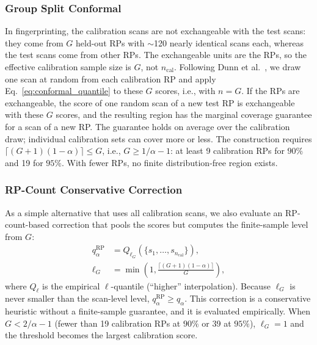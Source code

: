 \subsubsection{Group Split Conformal}
\label{subsubsec:group_conformal}
In fingerprinting, the calibration scans are not exchangeable with the test scans: they come from $G$ held-out RPs with $\sim$120 nearly identical scans each, whereas the test scans come from other RPs. The exchangeable units are the RPs, so the effective calibration sample size is $G$, not $n_{\mathrm{cal}}$. Following Dunn et al.~\cite{Dunn02102023}, we draw one scan at random from each calibration RP and apply Eq.~\eqref{eq:conformal_quantile} to these $G$ scores, i.e., with $n=G$. If the RPs are exchangeable, the score of one random scan of a new test RP is exchangeable with these $G$ scores, and the resulting region has the marginal coverage guarantee for a scan of a new RP. The guarantee holds on average over the calibration draw; individual calibration sets can cover more or less. The construction requires $\lceil(G+1)(1-\alpha)\rceil\leq G$, i.e., $G\geq1/\alpha-1$: at least 9 calibration RPs for $90\%$ and 19 for $95\%$. With fewer RPs, no finite distribution-free region exists.

\subsubsection{RP-Count Conservative Correction}
\label{subsubsec:rp_corrected}
As a simple alternative that uses all calibration scans, we also evaluate an RP-count-based correction that pools the scores but computes the finite-sample level from $G$:
\begin{align}
	q_{\alpha}^{\mathrm{RP}}
	&=
	Q_{\ell_G}\!\left(\{s_1,\ldots,s_{n_{\mathrm{cal}}}\}\right),
	\label{eq:rp_corrected_quantile}\\
	\ell_G
	&=
	\min\!\left(1,\frac{\lceil (G+1)(1-\alpha)\rceil}{G}\right),
	\label{eq:rp_level}
\end{align}
where $Q_{\ell}$ is the empirical $\ell$-quantile (``higher'' interpolation). Because $\ell_G$ is never smaller than the scan-level level, $q_{\alpha}^{\mathrm{RP}}\geq q_{\alpha}$. This correction is a conservative heuristic without a finite-sample guarantee, and it is evaluated empirically. When $G<2/\alpha-1$ (fewer than 19 calibration RPs at $90\%$ or 39 at $95\%$), $\ell_G=1$ and the threshold becomes the largest calibration score.


